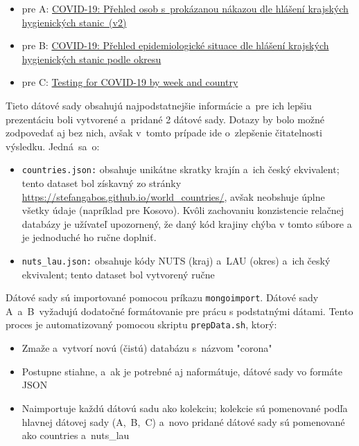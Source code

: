 \documentclass [11pt, a4paper]{article}
\begin{document}
\begin{itemize}
\item pre A: \href{https://onemocneni-aktualne.mzcr.cz/api/v2/covid-19/osoby.min.json }{COVID-19: Přehled osob s~prokázanou nákazou dle hlášení krajských hygienických stanic~(v2)}
\item pre B: \href{https://onemocneni-aktualne.mzcr.cz/api/v2/covid-19/kraj-okres-nakazeni-vyleceni-umrti.min.json}{COVID-19: Přehled epidemiologické situace dle hlášení krajských hygienických stanic podle okresu}
\item pre C: \href{https://www.ecdc.europa.eu/en/publications-data/covid-19-testing}{Testing for COVID-19 by week and country}
\end{itemize}

Tieto dátové sady obsahujú najpodstatnejšie informácie a~pre ich lepšiu prezentáciu boli vytvorené a~pridané 2 dátové sady. Dotazy by bolo možné zodpovedať aj bez nich, avšak v~tomto prípade ide o~zlepšenie čitatelnosti výsledku. Jedná~sa~o:
\begin{itemize}
\item \texttt{countries.json:} obsahuje unikátne skratky krajín a~ich český ekvivalent; tento dataset bol získavný zo stránky \href{https://stefangabos.github.io/world\_countries/}{https://stefangabos.github.io/world\_countries/}, avšak neobshuje úplne všetky údaje (napríklad pre Kosovo). Kvôli zachovaniu konzistencie relačnej databázy je užívateľ upozornený, že daný kód krajiny chýba v tomto súbore a je jednoduché ho ručne doplniť.
\item \texttt{nuts\_lau.json:} obsahuje kódy NUTS (kraj) a~LAU (okres) a~ich český ekvivalent; tento dataset bol vytvorený ručne
\end{itemize} 

Dátové sady sú importované pomocou príkazu \texttt{mongoimport}. Dátové sady A~a~B~vyžadujú dodatočné formátovanie pre prácu s podstatnými dátami. Tento proces je automatizovaný pomocou skriptu \texttt{prepData.sh}, ktorý:
\begin{itemize}
\item Zmaže a~vytvorí novú (čistú) databázu s~názvom "corona"
\item Postupne stiahne, a~ak je potrebné aj naformátuje, dátové sady vo formáte JSON
\item Naimportuje každú dátovú sadu ako kolekciu; kolekcie sú pomenované podľa hlavnej dátovej sady (A,~B,~C) a~novo pridané dátové sady sú pomenované ako countries a~nuts\_lau
\end{itemize}
\end{document}

